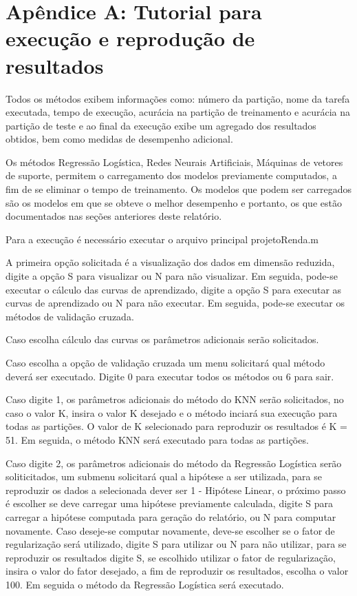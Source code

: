 \section{Apêndice A: Tutorial para execução e reprodução de resultados}

Todos os métodos exibem informações como: número da partição, nome da tarefa executada, tempo de execução, acurácia na partição de treinamento e acurácia na partição de teste e ao final da execução exibe um agregado dos resultados obtidos, bem como medidas de desempenho adicional.

Os métodos Regressão Logística, Redes Neurais Artificiais, Máquinas de vetores de suporte, permitem o carregamento dos modelos previamente computados, a fim de se eliminar o tempo de treinamento. Os modelos que podem ser carregados são os modelos em que se obteve o melhor desempenho e portanto, os que estão documentados nas seções anteriores deste relatório.

Para a execução é necessário executar o arquivo principal projetoRenda.m

A primeira opção solicitada é a visualização dos dados em dimensão reduzida, digite a opção S para visualizar ou N para não visualizar. Em seguida, pode-se executar o cálculo das curvas de aprendizado, digite a opção S para executar as curvas de aprendizado ou N para não executar. Em seguida, pode-se executar os métodos de validação cruzada.

Caso escolha cálculo das curvas os parâmetros adicionais serão solicitados.



Caso escolha a opção de validação cruzada um menu solicitará qual método deverá ser executado. Digite 0 para executar todos os métodos ou 6 para sair.

Caso digite 1, os parâmetros adicionais do método do KNN serão solicitados, no caso o valor K, insira o valor K desejado e o método inciará sua execução para todas as partições. O valor de K selecionado para reproduzir os resultados é K = 51. Em seguida, o método KNN será executado para todas as partições.

Caso digite 2, os parâmetros adicionais do método da Regressão Logística serão soliticitados, um submenu solicitará qual a hipótese a ser utilizada, para se reproduzir os dados a selecionada dever ser 1 - Hipótese Linear, o próximo passo é escolher se deve carregar uma hipótese previamente calculada, digite S para carregar a hipótese computada para geração do relatório, ou N para computar novamente. Caso deseje-se computar novamente, deve-se escolher se o fator de regularização será utilizado, digite S para utilizar ou N para não utilizar, para se reproduzir os resultados digite S, se escolhido utilizar o fator de regularização, insira o valor do fator desejado, a fim de reproduzir os resultados, escolha o valor 100. Em seguida o método da Regressão Logística será executado.

